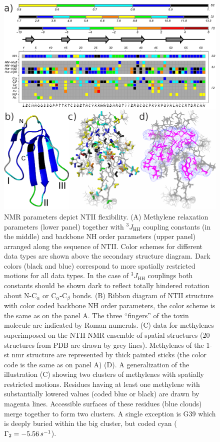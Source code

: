 \documentclass[twocolumn]{svjour3}           %
\begin{document}
\begin{figure}
    \centering
    \includegraphics[width=\textwidth]{Fig5_G2_struct}
    \caption{NMR parameters depict NTII flexibility.
    (A) Methylene relaxation parameters \gtwo{} (lower panel) together with
    $^3J_\text{HH}$
    coupling constants (in the middle) and backbone NH order parameters 
    (upper panel) arranged along the sequence of NTII. 
    Color schemes for different data types are shown above the secondary 
    structure diagram. Dark colors (black and blue) correspond to more 
    spatially restricted motions for all data types. 
    In the case of $^3J_\text{HH}$ couplings both constants should be shown dark 
    to reflect totally hindered rotation about N-$\text{C}_\alpha$ or 
    $\text{C}_\alpha$-$\text{C}_\beta$ bonds.
    (B) Ribbon diagram of NTII structure with color coded backbone NH order parameters, the color scheme is the same as on the panel A. 
    The three \enquote{fingers} of the toxin molecule are indicated by Roman numerals.
    (C) \gtwo{} data for methylenes superimposed on the NTII NMR ensemble of 
    spatial structures (20 structures from PDB are drawn by grey lines). 
    Methylenes of the 1-st nmr structure are represented by thick painted 
    sticks  (the color code is the same as on panel A) 
    (D). A generalization of the illustration (C) showing two clusters 
    of methylenes with spatially restricted motions. Residues having 
    at least one methylene with substantially lowered  \gtwo{} values 
    (coded blue or black) are drawn by magenta lines. Accessible surfaces 
    of these residues (blue clouds) merge together to form two clusters. 
    A single exception is G39 which is deeply buried within the big cluster, 
    but coded cyan ($\Gamma_2=-5.56\,s^{-1}$). 
    }
    \label{fig:g2:struct}
\end{figure}
\end{document}
